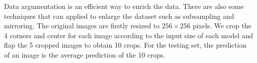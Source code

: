 Data argumentation is an efficient way to enrich the data. There are also some techniques that can applied to enlarge the dataset such as subsampling and mirroring. The original images are firstly resized to $256\times 256$ pixels. We crop the 4 corners and center for each image according to the input size of each model and flap the 5 cropped images to obtain 10 crops. For the testing set, the prediction of an image is the average prediction of the 10 crops.
